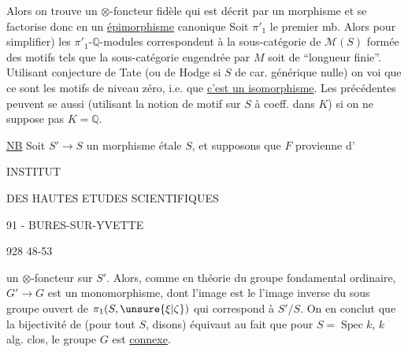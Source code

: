 Alors on trouve un $\otimes$-foncteur  fidèle
qui est décrit par un morphisme
et se factorise donc en un \uline{épimorphisme} canonique
\margin{$*$}
Soit $\pi'_1$ le premier mb. Alors 
 
pour simplifier) les $\pi'_1$-$\mathbb{Q}$-modules
correspondent à la sous-catégorie de $\mathcal{M}(S)$ formée
des motifs  tels que la sous-\inserted{$\otimes$-}catégorie engendrée
par $M$ soit de ``longueur finie''. Utilisant
conjecture de Tate (ou de Hodge si $S$ de
car. générique nulle) on  voi que ce sont les
motifs de  niveau  zéro, 
i.e. que \uline{c'est un
isomorphisme}. Les  précédentes peuvent
se  aussi (utilisant la notion de
motif sur $S$ à coeff. dans $K$) si on ne suppose
pas $K=\mathbb{Q}$.


\uline{NB} Soit $S'\longrightarrow S$ un morphisme
étale  $S$,  et supposons que $F$ provienne d'

INSTITUT

DES HAUTES ETUDES SCIENTIFIQUES

91 - BURES-SUR-YVETTE

928 48-53

un  $\otimes$-foncteur  sur $S'$. Alors,
comme en théorie du groupe fondamental ordinaire,
$G'\longrightarrow G$ est un monomorphisme, dont
l'image est le  l'image inverse  du sous
groupe ouvert de $\pi_1(S,\unsure{\xi|\zeta})$ qui correspond à $S'/S$.
On en conclut que la bijectivité de \unsure{$(*)$}
(pour tout $S$, disons) équivaut au fait que
pour $S=\operatorname{Spec}k$, $k$ alg. clos, le  groupe $G$
est \uline{connexe}.

